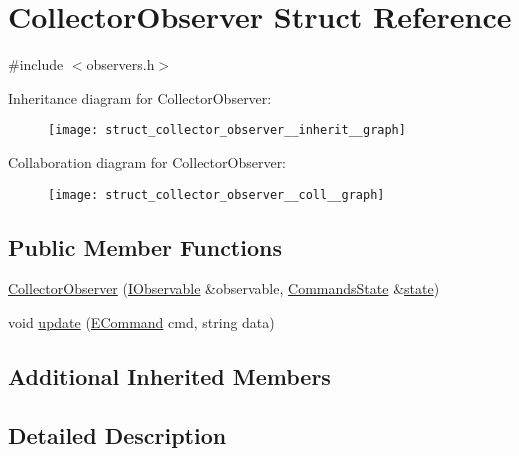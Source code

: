 \hypertarget{struct_collector_observer}{}\section{Collector\+Observer Struct Reference}
\label{struct_collector_observer}


{\ttfamily \#include $<$observers.\+h$>$}



Inheritance diagram for Collector\+Observer\+:
\nopagebreak
\begin{figure}[H]
\begin{center}
\leavevmode
\texttt{[image: struct\_collector\_observer\_\_inherit\_\_graph]}
\end{center}
\end{figure}


Collaboration diagram for Collector\+Observer\+:
\nopagebreak
\begin{figure}[H]
\begin{center}
\leavevmode
\texttt{[image: struct\_collector\_observer\_\_coll\_\_graph]}
\end{center}
\end{figure}
\subsection*{Public Member Functions}
\begin{DoxyCompactItemize}
\item 
\hyperlink{struct_collector_observer_a1bd761e7bb5cd7787c2496ad3cc3e465}{Collector\+Observer} (\hyperlink{struct_i_observable}{I\+Observable} \&observable, \hyperlink{class_commands_state}{Commands\+State} \&\hyperlink{struct_observer_base_a107ad54040309605fa5fafd481b97f2f}{state})
\item 
void \hyperlink{struct_collector_observer_adebc5768f5778ceb3e981362363db247}{update} (\hyperlink{interface_8h_aa299181f275f76f11365a410f7429098}{E\+Command} cmd, string data)
\end{DoxyCompactItemize}
\subsection*{Additional Inherited Members}


\subsection{Detailed Description}


